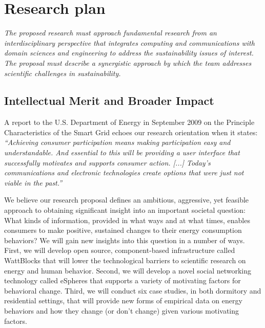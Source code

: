 
\section{Research plan}

{\em The proposed research must approach fundamental research from an interdisciplinary perspective that integrates computing and communications with domain sciences and engineering to address the sustainability issues of interest. The proposal must describe a synergistic approach by which the team addresses scientific challenges in sustainability.}

\subsection{Intellectual Merit and Broader Impact}
\label{sec:merit}

A report to the U.S. Department of Energy in September 2009 on the
Principle Characteristics of the Smart Grid echoes our research orientation
when it states: {\em ``Achieving consumer participation means
  making participation easy and understandable.  And essential to this will
  be providing a user interface that successfully motivates and supports
  consumer action. [...] Today's communications and electronic technologies
  create options that were just not viable in the past.''}
\cite{NETL:EnablesActiveParticipation}

We believe our research proposal defines an ambitious, aggressive, yet
feasible approach to obtaining significant insight into an important
societal question: What kinds of information, provided in what ways and at
what times, enables consumers to make positive, sustained changes to their
energy consumption behaviors?  We will gain new insights into this question
in a number of ways.  First, we will develop open source, component-based
infrastructure called WattBlocks that will lower the technological barriers
to scientific research on energy and human behavior.  Second, we will
develop a novel social networking technology called eSpheres that supports
a variety of motivating factors for behavioral change.  Third, we will
conduct six case studies, in both dormitory and residential settings, that
will provide new forms of empirical data on energy behaviors and how they
change (or don't change) given various motivating factors.

